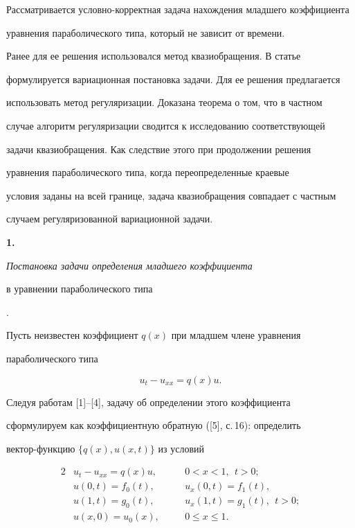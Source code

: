 \label{begin} 


 


 


Рассматривается условно-корректная задача нахождения младшего коэффициента 


уравнения параболического типа, который не зависит от времени. 


Ранее для ее решения использовался метод квазиобращения. В статье


формулируется вариационная постановка задачи. Для ее решения предлагается 


использовать метод регуляризации. Доказана теорема о том, что в частном 


случае алгоритм регуляризации сводится к исследованию соответствующей 


задачи квазиобращения. Как следствие этого при продолжении решения 


уравнения параболического типа, когда переопределенные краевые 


условия заданы на всей границе, задача квазиобращения совпадает с частным 


случаем регуляризованной вариационной задачи. 


\medskip 


 


{\bf 1.} {\it Постановка задачи определения младшего коэффициента 


в уравнении параболического типа}. 


Пусть неизвестен коэффициент $q(x)$ при младшем члене уравнения 


параболического типа 


\begin{equation} 


u_t-u_{xx}=q(x)u. \tag{1.1} 


\end{equation} 


Следуя работам [1]--[4], задачу об определении этого коэффициента 


сформулируем как коэффициентную обратную ([5], с.\,16): определить 


вектор-функцию $\{q(x),u(x,t)\}$ из условий 


\begin{alignat*}{2} 


& u_t-u_{xx}=q(x)u, &\quad & 0<x<1,\ \ t>0; \\ 


& u(0,t)=f_0(t), &\quad & u_x(0,t)=f_1(t), \\ 


& u(1,t)=g_0(t), &\quad & u_x(1,t)=g_1(t),\ \ t>0;\\ 


& u(x,0)=u_0(x), & \quad & 0\le x\le1. 


\end{alignat*} 





